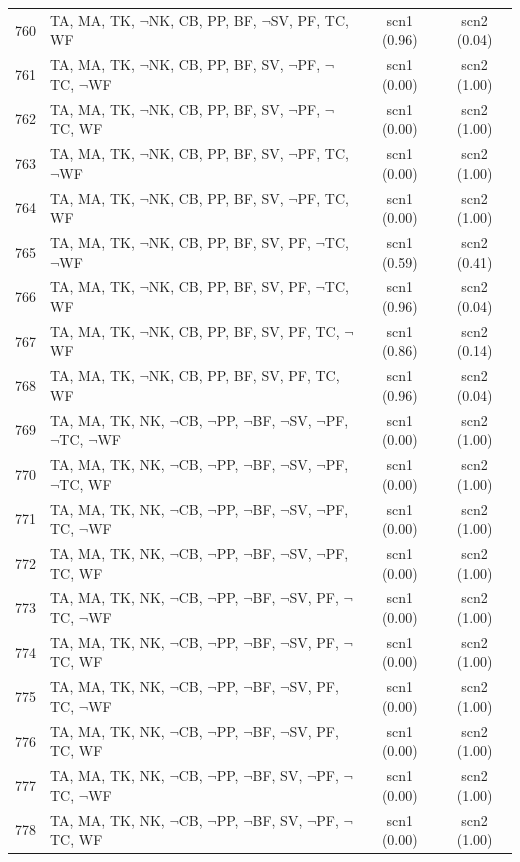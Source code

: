 \documentclass[12pt]{article}
\begin{document}
\begin{longtable}{|l|l|c|c|}
760 & TA, MA, TK, $\neg$NK, CB, PP, BF, $\neg$SV, PF, TC, WF & scn1 (0.96) & scn2 (0.04)\\
761 & TA, MA, TK, $\neg$NK, CB, PP, BF, SV, $\neg$PF, $\neg$TC, $\neg$WF & scn1 (0.00) & scn2 (1.00)\\
762 & TA, MA, TK, $\neg$NK, CB, PP, BF, SV, $\neg$PF, $\neg$TC, WF & scn1 (0.00) & scn2 (1.00)\\
763 & TA, MA, TK, $\neg$NK, CB, PP, BF, SV, $\neg$PF, TC, $\neg$WF & scn1 (0.00) & scn2 (1.00)\\
764 & TA, MA, TK, $\neg$NK, CB, PP, BF, SV, $\neg$PF, TC, WF & scn1 (0.00) & scn2 (1.00)\\
765 & TA, MA, TK, $\neg$NK, CB, PP, BF, SV, PF, $\neg$TC, $\neg$WF & scn1 (0.59) & scn2 (0.41)\\
766 & TA, MA, TK, $\neg$NK, CB, PP, BF, SV, PF, $\neg$TC, WF & scn1 (0.96) & scn2 (0.04)\\
767 & TA, MA, TK, $\neg$NK, CB, PP, BF, SV, PF, TC, $\neg$WF & scn1 (0.86) & scn2 (0.14)\\
768 & TA, MA, TK, $\neg$NK, CB, PP, BF, SV, PF, TC, WF & scn1 (0.96) & scn2 (0.04)\\
769 & TA, MA, TK, NK, $\neg$CB, $\neg$PP, $\neg$BF, $\neg$SV, $\neg$PF, $\neg$TC, $\neg$WF & scn1 (0.00) & scn2 (1.00)\\
770 & TA, MA, TK, NK, $\neg$CB, $\neg$PP, $\neg$BF, $\neg$SV, $\neg$PF, $\neg$TC, WF & scn1 (0.00) & scn2 (1.00)\\
771 & TA, MA, TK, NK, $\neg$CB, $\neg$PP, $\neg$BF, $\neg$SV, $\neg$PF, TC, $\neg$WF & scn1 (0.00) & scn2 (1.00)\\
772 & TA, MA, TK, NK, $\neg$CB, $\neg$PP, $\neg$BF, $\neg$SV, $\neg$PF, TC, WF & scn1 (0.00) & scn2 (1.00)\\
773 & TA, MA, TK, NK, $\neg$CB, $\neg$PP, $\neg$BF, $\neg$SV, PF, $\neg$TC, $\neg$WF & scn1 (0.00) & scn2 (1.00)\\
774 & TA, MA, TK, NK, $\neg$CB, $\neg$PP, $\neg$BF, $\neg$SV, PF, $\neg$TC, WF & scn1 (0.00) & scn2 (1.00)\\
775 & TA, MA, TK, NK, $\neg$CB, $\neg$PP, $\neg$BF, $\neg$SV, PF, TC, $\neg$WF & scn1 (0.00) & scn2 (1.00)\\
776 & TA, MA, TK, NK, $\neg$CB, $\neg$PP, $\neg$BF, $\neg$SV, PF, TC, WF & scn1 (0.00) & scn2 (1.00)\\
777 & TA, MA, TK, NK, $\neg$CB, $\neg$PP, $\neg$BF, SV, $\neg$PF, $\neg$TC, $\neg$WF & scn1 (0.00) & scn2 (1.00)\\
778 & TA, MA, TK, NK, $\neg$CB, $\neg$PP, $\neg$BF, SV, $\neg$PF, $\neg$TC, WF & scn1 (0.00) & scn2 (1.00)\\

\end{longtable}
\end{document}
